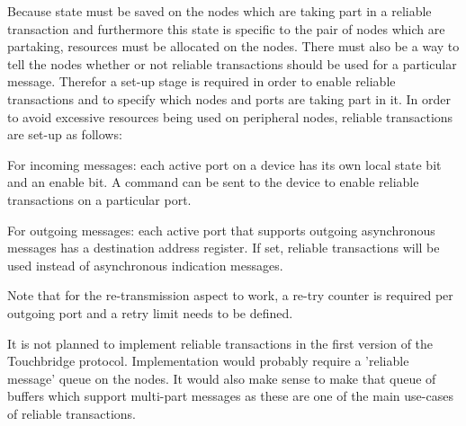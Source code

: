 \documentclass[12pt]{article}
\begin{document}
Because state must be saved on the nodes which are taking part in a reliable
transaction and furthermore this state is specific to the pair of nodes which
are partaking, resources must be allocated on the nodes. There must also be a
way to tell the nodes whether or not reliable transactions should be used for a
particular message. Therefor a set-up stage is required in order to enable
reliable transactions and to specify which nodes and ports are taking part in
it. In order to avoid excessive resources being used on peripheral nodes,
reliable transactions are set-up as follows:

For incoming messages: each active port on a device has its own local state bit
and an enable bit.  A command can be sent to the device to enable reliable
transactions on a particular port.

For outgoing messages: each active port that supports outgoing asynchronous
messages has a destination address register. If set, reliable transactions will
be used instead of asynchronous indication messages.

Note that for the re-transmission aspect to work, a re-try counter is required
per outgoing port and a retry limit needs to be defined.

It is not planned to implement reliable transactions in the first version of
the Touchbridge protocol. Implementation would probably require a 'reliable
message' queue on the nodes. It would also make sense to make that queue of
buffers which support multi-part messages as these are one of the main
use-cases of reliable transactions.
\end{document}
